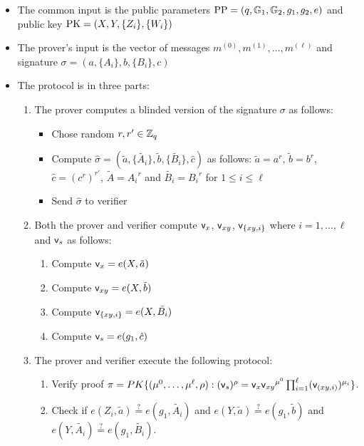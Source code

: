 \documentclass[11pt]{report}
\begin{document}
\begin{itemize}
\item The common input is the public parameters $\mathrm{PP} = (q, \mathbb{G}_1, \mathbb{G}_2, g_1, g_2, e)$ and public key $\mathrm{PK} = (X, Y, \{Z_i\}, \{W_i\})$
\item The prover's input is the vector of messages $m^{(0)}, m^{(1)}, \dots, m^{(\ell)}$ and signature $\sigma = (a, \{A_i\}, b, \{B_i\}, c)$
\item The protocol is in three parts:
\begin{enumerate}
\item The prover computes a blinded version of the signature $\sigma$ as follows:
\begin{itemize}
\item Chose random $r, r' \in \mathbb{Z}_q$
\item Compute $\hat{\sigma} = (\tilde{a}, \{\tilde{A_i}\}, \tilde{b}, \{ \tilde{B_i} \}, \hat{c})$ as follows: $\tilde{a} = a^r$, $\tilde{b} = b^r$, $\hat{c} = ({c^r})^{r'}$, $\tilde{A} = {A_i}^r$ and $\tilde{B_i}= {B_i}^r$ for $1 \le i \le \ell$
\item Send $\hat{\sigma}$ to verifier
\end{itemize}

\item Both the prover and verifier compute ${\sf v}_x$, ${\sf v}_{xy}$, ${\sf v}_{\{xy,i\}}$  where $i = 1, \dots, \ell$ and ${\sf v}_s$ as follows:
\begin{enumerate}
\item Compute ${\sf v}_x = e(X, \tilde{a})$
\item Compute ${\sf v}_{xy} = e(X, \tilde{b})$
\item Compute ${\sf v}_{\{xy,i\}} = e(X, \tilde{B_i})$
\item Compute ${\sf v}_s = e(g_1, \hat{c})$
\end{enumerate}

\item The prover and verifier execute the following protocol:
\begin{enumerate}
\item Verify proof $\pi = PK\{(\mu^0, \dots, \mu^\ell, \rho) : ({{\sf v}_s})^\rho = {{\sf v}_x} {{\sf v}_{xy}}^{\mu^0}  \prod_{i=1}^\ell ({\sf v}_{(xy,i)})^{\mu_i}\}$.
\item Check if $e(Z_i, \tilde{a}) \stackrel{?}{=} e(g_1, \tilde{A_i})$ and $e(Y, \tilde{a}) \stackrel{?}{=} e(g_1, \tilde{b})$ and $e(Y, \tilde{A_i}) \stackrel{?}{=} e(g_1, \tilde{B_i})$.
\end{enumerate}

\end{enumerate}
\end{itemize}
\end{document}
